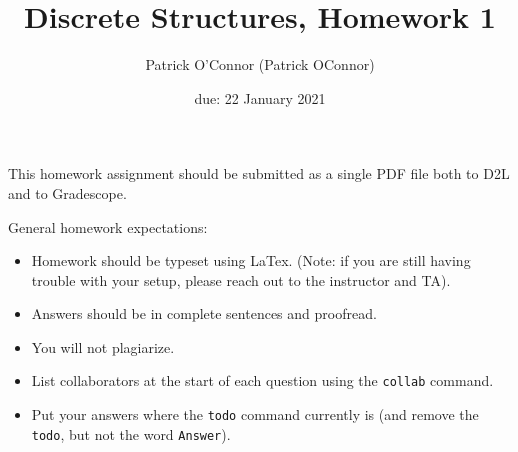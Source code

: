 \documentclass{article}
\title{Discrete Structures, Homework 1}
\author{Patrick O'Connor (Patrick OConnor)}
\date{due: 22 January 2021}
\begin{document}
\maketitle

This homework assignment should be
submitted as a single PDF file both to D2L and to Gradescope.

General homework expectations:
\begin{itemize}
    \item Homework should be typeset using LaTex.  (Note: if you are still
        having trouble with your setup, please reach out to the instructor and
        TA).
    \item Answers should be in complete sentences and proofread.
    \item You will not plagiarize.
    \item List collaborators at the start of each question using the
        \texttt{collab} command.
    \item Put your answers where the \texttt{todo} command currently is (and
        remove the \texttt{todo}, but not the word \texttt{Answer}).
\end{itemize}

\end{document}
